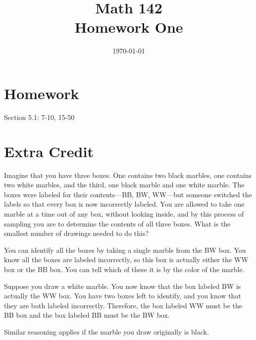\documentclass{exam}
\author{}
\date{\today}
\title{Math 142 \\ Homework One}
\begin{document}
  \maketitle

  \section{Homework}
  Section 5.1: 7-10, 15-50

  \section{Extra Credit}

  Imagine that you have three boxes. One contains two black marbles, one contains two white marbles, and the third,
  one black marble and one white marble. The boxes were labeled for their contents---BB, BW, WW---but someone switched the
  labels so that every box is now incorrectly labeled. You are allowed to take one marble at a time out of any box,
  without looking inside, and by this process of sampling you are to determine the contents of all three boxes. What is
  the smallest number of drawings needed to do this?
   
  \begin{solution}
    You can identify all the boxes by taking a single marble from the BW box.  You know all the boxes are labeled
    incorrectly, so this box is actually either the WW box or the BB box.  You can tell which of these it is by the color
    of the marble.

    Suppose you draw a white marble.  You now know that the box labeled BW is actually the WW box.  You have two boxes
    left to identify, and you know that they are both labeled incorrectly.  Therefore, the box labeled WW must be the BB
    box and the box labeled BB must be the BW box.
    
    Similar reasoning applies if the marble you draw originally is black.
  \end{solution}

  \ifprintanswers
\end{document}
